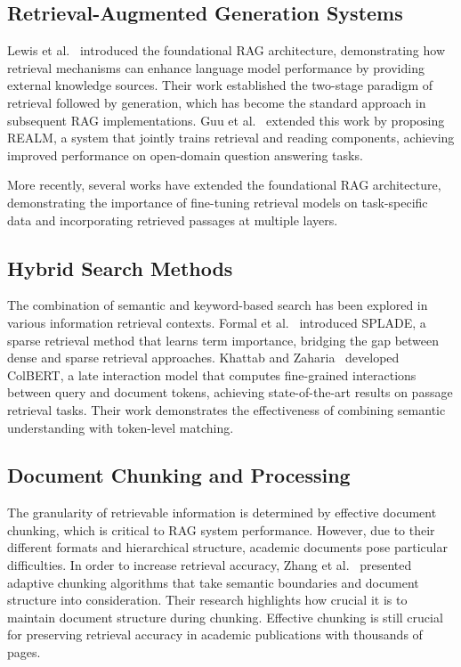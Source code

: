 \documentclass[runningheads]{llncs}
\begin{document}
\subsection{Retrieval-Augmented Generation Systems}

Lewis et al.~\cite{lewis2020retrieval} introduced the foundational RAG architecture, demonstrating how retrieval mechanisms can enhance language model performance by providing external knowledge sources. Their work established the two-stage paradigm of retrieval followed by generation, which has become the standard approach in subsequent RAG implementations. Guu et al.~\cite{guu2020retrieval} extended this work by proposing REALM, a system that jointly trains retrieval and reading components, achieving improved performance on open-domain question answering tasks.

More recently, several works have extended the foundational RAG architecture, demonstrating the importance of fine-tuning retrieval models on task-specific data and incorporating retrieved passages at multiple layers.

\subsection{Hybrid Search Methods}

The combination of semantic and keyword-based search has been explored in various information retrieval contexts. Formal et al.~\cite{formal2021splade} introduced SPLADE, a sparse retrieval method that learns term importance, bridging the gap between dense and sparse retrieval approaches. Khattab and Zaharia~\cite{khattab2020colbert} developed ColBERT, a late interaction model that computes fine-grained interactions between query and document tokens, achieving state-of-the-art results on passage retrieval tasks. Their work demonstrates the effectiveness of combining semantic understanding with token-level matching.

\subsection{Document Chunking and Processing}

The granularity of retrievable information is determined by effective document chunking, which is critical to RAG system performance. However, due to their different formats and hierarchical structure, academic documents pose particular difficulties. In order to increase retrieval accuracy, Zhang et al.~\cite{zhang2023adaptive} presented adaptive chunking algorithms that take semantic boundaries and document structure into consideration. Their research highlights how crucial it is to maintain document structure during chunking. Effective chunking is still crucial for preserving retrieval accuracy in academic publications with thousands of pages.
\end{document}
